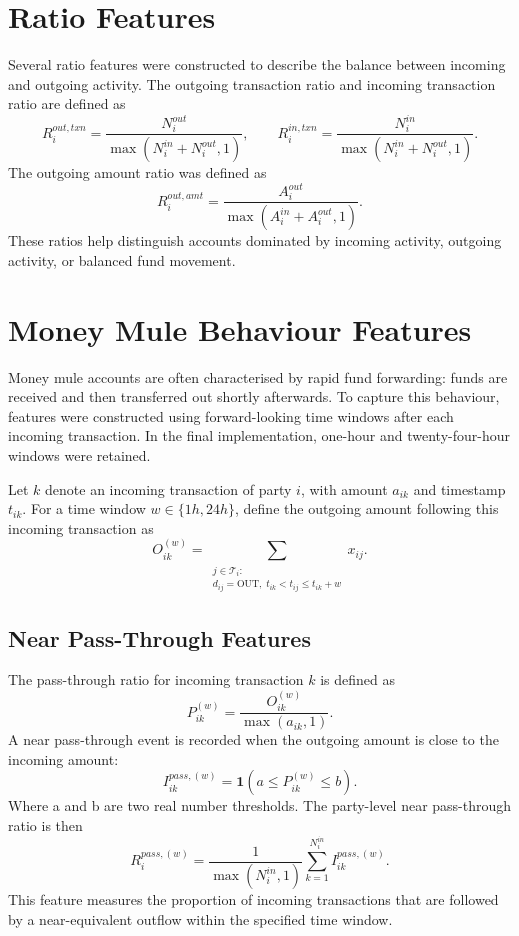 \section{Ratio Features}

Several ratio features were constructed to describe the balance between incoming and outgoing activity. The outgoing transaction ratio and incoming transaction ratio are defined as
\[
R_i^{out,txn} =
\frac{N_i^{out}}{\max(N_i^{in}+N_i^{out},1)},
\qquad
R_i^{in,txn} =
\frac{N_i^{in}}{\max(N_i^{in}+N_i^{out},1)}.
\]
The outgoing amount ratio was defined as
\[
R_i^{out,amt} =
\frac{A_i^{out}}{\max(A_i^{in}+A_i^{out},1)}.
\]
These ratios help distinguish accounts dominated by incoming activity, outgoing activity, or balanced fund movement.

\section{Money Mule Behaviour Features}

Money mule accounts are often characterised by rapid fund forwarding: funds are received and then transferred out shortly afterwards. To capture this behaviour, features were constructed using forward-looking time windows after each incoming transaction. In the final implementation, one-hour and twenty-four-hour windows were retained.

Let \(k\) denote an incoming transaction of party \(i\), with amount \(a_{ik}\) and timestamp \(t_{ik}\). For a time window \(w \in \{1h,24h\}\), define the outgoing amount following this incoming transaction as
\[
O_{ik}^{(w)}
=
\sum_{\substack{j \in \mathcal{T}_i:\\
d_{ij}=\mathrm{OUT},\;
t_{ik}<t_{ij}\leq t_{ik}+w}}
x_{ij}.
\]

\subsection{Near Pass-Through Features}

The pass-through ratio for incoming transaction \(k\) is defined as
\[
P_{ik}^{(w)}
=
\frac{O_{ik}^{(w)}}{\max(a_{ik},1)}.
\]
A near pass-through event is recorded when the outgoing amount is close to the incoming amount:
\[
I_{ik}^{pass,(w)}
=
\mathbf{1}\left(a \leq P_{ik}^{(w)} \leq b\right).
\]
Where a and b are two real number thresholds. The party-level near pass-through ratio is then
\[
R_i^{pass,(w)}
=
\frac{1}{\max(N_i^{in},1)}
\sum_{k=1}^{N_i^{in}}
I_{ik}^{pass,(w)}.
\]
This feature measures the proportion of incoming transactions that are followed by a near-equivalent outflow within the specified time window.

